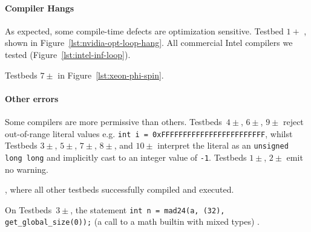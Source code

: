 \paragraph{Compiler Hangs} %
As expected, some compile-time defects are optimization sensitive. Testbed $1+$ , shown in Figure~\ref{lst:nvidia-opt-loop-hang}. All commercial Intel compilers we tested  (Figure~\ref{lst:intel-inf-loop}).

Testbeds $7\pm$  in Figure~\ref{lst:xeon-phi-spin}.

\paragraph{Other errors} %

Some compilers are more permissive than others. Testbeds~$4\pm$, $6\pm$, $9\pm$ reject out-of-range literal values e.g. \texttt{int i = 0xFFFFFFFFFFFFFFFFFFFFFFFF}, whilst Testbeds $3\pm$, $5\pm$, $7\pm$, $8\pm$, and $10\pm$ interpret the literal as an \texttt{unsigned long long} and implicitly cast to an integer value of \texttt{-1}. Testbeds $1\pm$, $2\pm$ emit no warning.

, where all other testbeds successfully compiled and executed.

On Testbeds~$3\pm$, the statement \texttt{int n = mad24(a, (32), get\_global\_size(0));} (a call to a math builtin with mixed types) .


%
%


